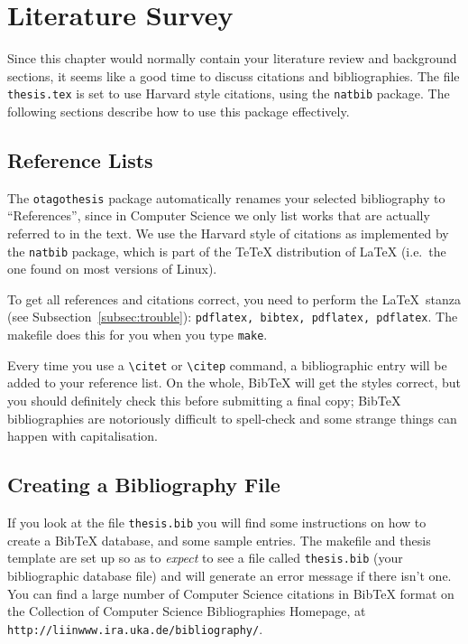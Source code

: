 \chapter{Literature Survey}
\label{chap:bib}

Since this chapter would normally contain your literature review and
background sections, it seems like a good time to discuss citations
and bibliographies.  The file {\tt thesis.tex} is set to use Harvard
style citations, using the \verb|natbib| package.
The following sections describe how to use this package effectively.

\section{Reference Lists}

The {\tt otagothesis} package automatically renames your selected
bibliography to ``References'', since in Computer Science we only list
works that are actually referred to in the text.  We use the Harvard
style of citations as implemented by the \verb|natbib| package, which
is part of the TeTeX distribution of LaTeX (i.e.\ the one found on
most versions of Linux).

To get all references and citations correct, you need to perform the
\LaTeX\ stanza (see Subsection~\ref{subsec:trouble}): {\tt pdflatex,
bibtex, pdflatex, pdflatex}.  The makefile does this for you when you type
{\tt make}.

Every time you use a \verb|\citet| or \verb|\citep| command, a
bibliographic entry
will be added to your reference list.  On the whole, BibTeX will get
the styles correct, but you should definitely check this before
submitting a final copy; BibTeX bibliographies are notoriously
difficult to spell-check and some strange things can happen with
capitalisation.

\section{Creating a Bibliography File}

If you look at the file {\tt thesis.bib} you will find some
instructions on how to create a BibTeX database, and some sample
entries.  The makefile and thesis template are set up so as to
{\em expect} to see a file called {\tt thesis.bib} (your bibliographic
database file) and will generate an error message if there isn't one.
You can find a large number of Computer Science citations in
BibTeX format on the Collection of Computer Science Bibliographies
Homepage, at {\tt http://liinwww.ira.uka.de/bibliography/}.

